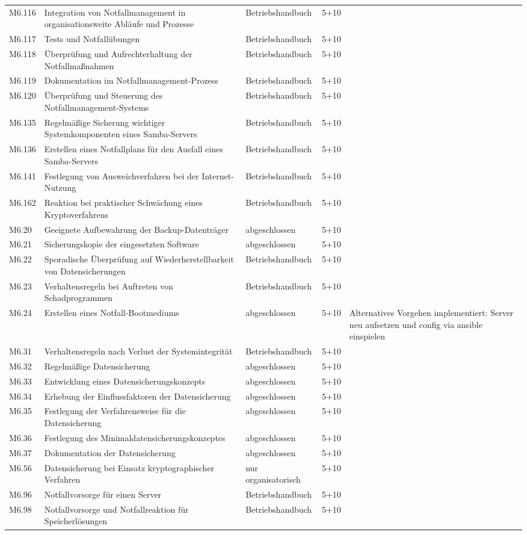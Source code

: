 \begin{longtable}{lp{3.7cm}|p{3cm}l|p{3.8cm}}
M6.116 & Integration von Notfallmanagement in organisationsweite Abläufe und Prozesse & Betriebshandbuch & 5+10 &  \\
M6.117 & Tests und Notfallübungen & Betriebshandbuch & 5+10 &  \\
M6.118 & Überprüfung und Aufrechterhaltung der Notfallmaßnahmen & Betriebshandbuch & 5+10 &  \\
M6.119 & Dokumentation im Notfallmanagement-Prozess & Betriebshandbuch & 5+10 &  \\
M6.120 & Überprüfung und Steuerung des Notfallmanagement-Systems & Betriebshandbuch & 5+10 &  \\
M6.135 & Regelmäßige Sicherung wichtiger Systemkomponenten eines Samba-Servers & Betriebshandbuch & 5+10 &  \\
M6.136 &  Erstellen eines Notfallplans für den Ausfall eines Samba-Servers & Betriebshandbuch & 5+10 &  \\
M6.141 & Festlegung von Ausweichverfahren bei der Internet-Nutzung & Betriebshandbuch & 5+10 &  \\
M6.162 & Reaktion bei praktischer Schwächung eines Kryptoverfahrens & Betriebshandbuch & 5+10 &  \\
M6.20 & Geeignete Aufbewahrung der Backup-Datenträger & abgeschlossen & 5+10 &  \\
M6.21 & Sicherungskopie der eingesetzten Software & abgeschlossen & 5+10 &  \\
M6.22 & Sporadische Überprüfung auf Wiederherstellbarkeit von Datensicherungen & Betriebshandbuch & 5+10 &  \\
M6.23 & Verhaltensregeln bei Auftreten von Schadprogrammen & Betriebshandbuch & 5+10 &  \\
M6.24 & Erstellen eines Notfall-Bootmediums & abgeschlossen & 5+10 & Alternatives Vorgehen implementiert: Server neu aufsetzen und config via ansible einspielen \\
M6.31 & Verhaltensregeln nach Verlust der Systemintegrität & Betriebshandbuch & 5+10 &  \\
M6.32 & Regelmäßige Datensicherung & abgeschlossen & 5+10 &  \\
M6.33 & Entwicklung eines Datensicherungskonzepts & abgeschlossen & 5+10 &  \\
M6.34 & Erhebung der Einflussfaktoren der Datensicherung & abgeschlossen & 5+10 &  \\
M6.35 & Festlegung der Verfahrensweise für die Datensicherung & abgeschlossen & 5+10 &  \\
M6.36 & Festlegung des Minimaldatensicherungskonzeptes & abgeschlossen & 5+10 &  \\
M6.37 & Dokumentation der Datensicherung & abgeschlossen & 5+10 &  \\
M6.56 & Datensicherung bei Einsatz kryptographischer Verfahren & nur organisatorisch & 5+10 &  \\
M6.96 & Notfallvorsorge für einen Server & Betriebshandbuch & 5+10 &  \\
M6.98 & Notfallvorsorge und Notfallreaktion für Speicherlösungen & Betriebshandbuch & 5+10 &  \\
\bottomrule
\end{longtable}

